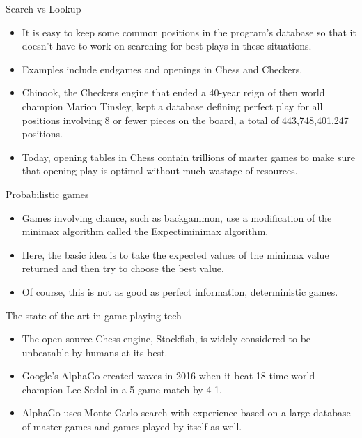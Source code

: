 \documentclass{beamer}
\begin{document}
\begin{frame}{Search vs Lookup}
  \begin{itemize}
    \item It is easy to keep some common positions in the program's database so that it doesn't have to work on searching for best plays in these situations.
    \item Examples include endgames and openings in Chess and Checkers.
    \item Chinook, the Checkers engine that ended a 40-year reign of then world champion Marion Tinsley, kept a database defining perfect play for all positions involving 8 or fewer pieces on the board, a total of 443,748,401,247 positions.
    \item Today, opening tables in Chess contain trillions of master games to make sure that opening play is optimal without much wastage of resources.
  \end{itemize}
\end{frame}

\begin{frame}{Probabilistic games}
  \begin{itemize}
    \item Games involving chance, such as backgammon, use a modification of the minimax algorithm called the Expectiminimax algorithm.
    \item Here, the basic idea is to take the expected values of the minimax value returned and then try to choose the best value.
    \item Of course, this is not as good as perfect information, deterministic games.
  \end{itemize}
\end{frame}

\begin{frame}{The state-of-the-art in game-playing tech}
  \begin{itemize}
    \item The open-source Chess engine, Stockfish, is widely considered to be unbeatable by humans at its best.
    \item Google's AlphaGo created waves in 2016 when it beat 18-time world champion Lee Sedol in a 5 game match by 4-1.
    \item AlphaGo uses Monte Carlo search with experience based on a large database of master games and games played by itself as well.
  \end{itemize}
\end{frame}
\end{document}
